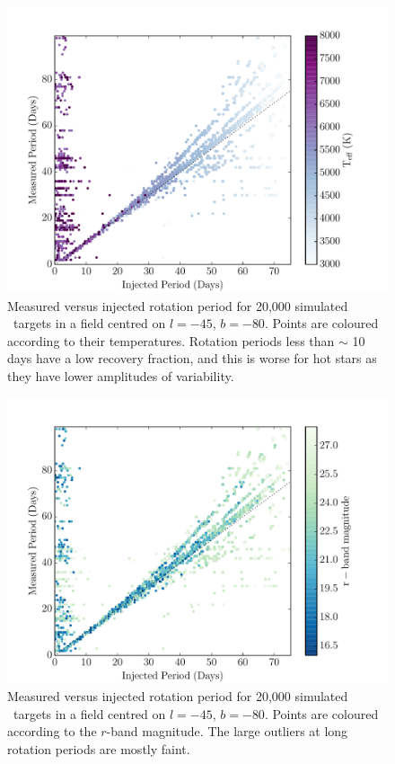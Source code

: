 \begin{figure}
\begin{center}
\includegraphics[width=6in, clip=true]{figures/pvp_T_-80.pdf}
\caption[\LSST\ rotation period recovery results with temperature dependence]
{Measured versus injected rotation period for 20,000 simulated \LSST\ targets
in a field centred on $l=-45$, $b=-80$.
Points are coloured according to their temperatures.
Rotation periods less than $\sim$ 10 days have a low recovery fraction, and
this is worse for hot stars as they have lower amplitudes of variability.}
\label{fig:derek}
\end{center}
\end{figure}

\begin{figure}
\begin{center}
\includegraphics[width=6in, clip=true]{figures/pvp_r_-80.pdf}
\caption[\LSST\ rotation period recovery results with magnitude dependence]
{Measured versus injected rotation period for 20,000 simulated \LSST\ targets
in a field centred on $l=-45$, $b=-80$.
Points are coloured according to the $r$-band magnitude.
The large outliers at long rotation periods are mostly faint.}
\label{fig:derek2}
\end{center}
\end{figure}

